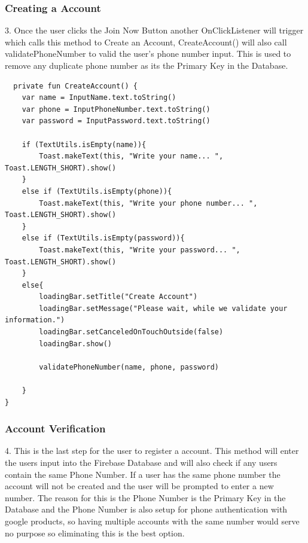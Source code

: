 \subsubsection{Creating a Account}
3. Once the user clicks the Join Now Button another OnClickListener will trigger which calls this method to Create an Account, CreateAccount() will also call validatePhoneNumber to valid the user's phone number input. This is used to remove any duplicate phone number as its the Primary Key in the Database. 
\begin{verbatim}
  private fun CreateAccount() {
    var name = InputName.text.toString()
    var phone = InputPhoneNumber.text.toString()
    var password = InputPassword.text.toString()

    if (TextUtils.isEmpty(name)){
        Toast.makeText(this, "Write your name... ", Toast.LENGTH_SHORT).show()
    }
    else if (TextUtils.isEmpty(phone)){
        Toast.makeText(this, "Write your phone number... ", Toast.LENGTH_SHORT).show()
    }
    else if (TextUtils.isEmpty(password)){
        Toast.makeText(this, "Write your password... ", Toast.LENGTH_SHORT).show()
    }
    else{
        loadingBar.setTitle("Create Account")
        loadingBar.setMessage("Please wait, while we validate your information.")
        loadingBar.setCanceledOnTouchOutside(false)
        loadingBar.show()

        validatePhoneNumber(name, phone, password)

    }
}
\end{verbatim}

\subsubsection{Account Verification}
4. This is the last step for the user to register a account. This method will enter the users input into the Firebase Database and will also check if any users contain the same Phone Number. If a user has the same phone number the account will not be created and the user will be prompted to enter a new number.
The reason for this is the Phone Number is the Primary Key in the Database and the Phone Number is also setup for phone authentication with google products, so having multiple accounts with the same number would serve no purpose so eliminating this is the best option.\newline \newline \newline

